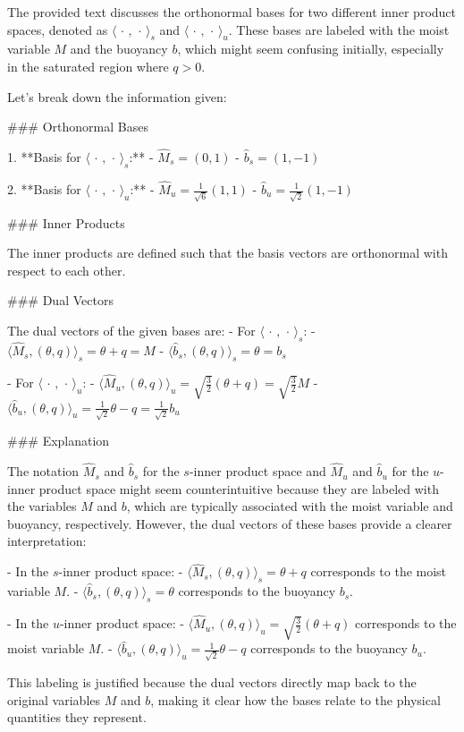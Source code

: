 The provided text discusses the orthonormal bases for two different inner product spaces, denoted as \( {\langle \,\cdot\,,\,\cdot\, \rangle}_{s} \) and \( {\langle \,\cdot\,,\,\cdot\, \rangle}_{u} \). These bases are labeled with the moist variable \( M \) and the buoyancy \( b \), which might seem confusing initially, especially in the saturated region where \( q > 0 \).

Let's break down the information given:

### Orthonormal Bases

1. **Basis for \( {\langle \,\cdot\,,\,\cdot\, \rangle}_{s} \):**
   - \(\widehat{M}_s = (0, 1)\)
   - \(\widehat{b}_s = (1, -1)\)

2. **Basis for \( {\langle \,\cdot\,,\,\cdot\, \rangle}_{u} \):**
   - \(\widehat{M}_u = \frac{1}{\sqrt{6}} (1, 1)\)
   - \(\widehat{b}_u = \frac{1}{\sqrt{2}} (1, -1)\)

### Inner Products

The inner products are defined such that the basis vectors are orthonormal with respect to each other.

### Dual Vectors

The dual vectors of the given bases are:
- For \( {\langle \,\cdot\,,\,\cdot\, \rangle}_{s} \):
  - \(\langle \widehat{M}_s, (\theta, q) \rangle_s = \theta + q = M\)
  - \(\langle \widehat{b}_s, (\theta, q) \rangle_s = \theta = b_s\)

- For \( {\langle \,\cdot\,,\,\cdot\, \rangle}_{u} \):
  - \(\langle \widehat{M}_u, (\theta, q) \rangle_u = \sqrt{\frac{3}{2}} (\theta + q) = \sqrt{\frac{3}{2}} M\)
  - \(\langle \widehat{b}_u, (\theta, q) \rangle_u = \frac{1}{\sqrt{2}} \theta - q = \frac{1}{\sqrt{2}} b_u\)

### Explanation

The notation \( \widehat{M}_s \) and \( \widehat{b}_s \) for the \( s \)-inner product space and \( \widehat{M}_u \) and \( \widehat{b}_u \) for the \( u \)-inner product space might seem counterintuitive because they are labeled with the variables \( M \) and \( b \), which are typically associated with the moist variable and buoyancy, respectively. However, the dual vectors of these bases provide a clearer interpretation:

- In the \( s \)-inner product space:
  - \(\langle \widehat{M}_s, (\theta, q) \rangle_s = \theta + q\) corresponds to the moist variable \( M \).
  - \(\langle \widehat{b}_s, (\theta, q) \rangle_s = \theta\) corresponds to the buoyancy \( b_s \).

- In the \( u \)-inner product space:
  - \(\langle \widehat{M}_u, (\theta, q) \rangle_u = \sqrt{\frac{3}{2}} (\theta + q)\) corresponds to the moist variable \( M \).
  - \(\langle \widehat{b}_u, (\theta, q) \rangle_u = \frac{1}{\sqrt{2}} \theta - q\) corresponds to the buoyancy \( b_u \).

This labeling is justified because the dual vectors directly map back to the original variables \( M \) and \( b \), making it clear how the bases relate to the physical quantities they represent.